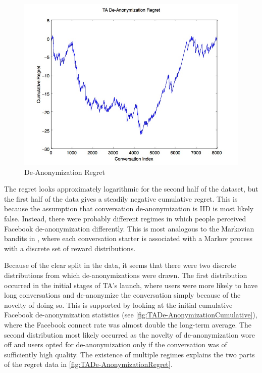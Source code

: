 \begin{figure}[H]
\centering
\includegraphics[trim= 0mm 0mm 0mm 0mm, clip, scale=0.5]{./Figures/TADe-AnonymizationRegret.jpg}
\caption{De-Anonymization Regret}
\label{fig:TADe-AnonymizationRegret}
\end{figure}

The regret looks approximately logarithmic for the second half of the dataset, but the first half of the data gives a steadily negative cumulative regret. This is because the assumption that conversation de-anonymization is IID is most likely false. Instead, there were probably different regimes in which people perceived Facebook de-anonymization differently. This is most analogous to the Markovian bandits in \cite{bubeck12}, where each conversation starter is associated with a Markov process with a discrete set of reward distributions.

Because of the clear split in the data, it seems that there were two discrete distributions from which de-anonymizations were drawn. The first distribution occurred in the initial stages of TA's launch, where users were more likely to have long conversations and de-anonymize the conversation simply because of the novelty of doing so. This is supported by looking at the initial cumulative Facebook de-anonymization statistics (see \autoref{fig:TADe-AnonymizationCumulative}), where the Facebook connect rate was almost double the long-term average. The second distribution most likely occurred as the novelty of de-anonymization wore off and users opted for de-anonymization only if the conversation was of sufficiently high quality. The existence of multiple regimes explains the two parts of the regret data in \autoref{fig:TADe-AnonymizationRegret}.

